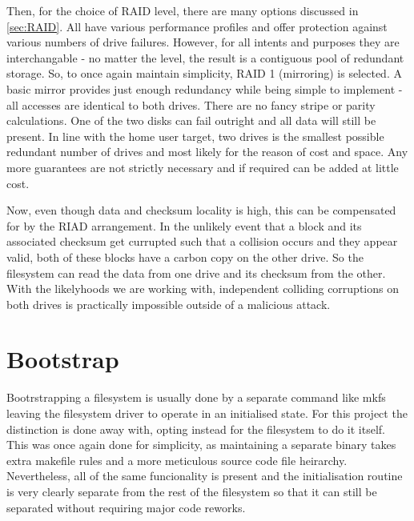         Then, for the choice of RAID level, there are many options discussed in
        \autoref{sec:RAID}. All have various performance profiles and offer
        protection against various numbers of drive failures. However, for all
        intents and purposes they are interchangable - no matter the level, the
        result is a contiguous pool of redundant storage. So, to once again
        maintain simplicity, RAID 1 (mirroring) is selected. A basic mirror
        provides just enough redundancy while being simple to implement - all
        accesses are identical to both drives. There are no fancy stripe or
        parity calculations. One of the two disks can fail outright and all
        data will still be present. In line with the home user target, two
        drives is the smallest possible redundant number of drives and most
        likely for the reason of cost and space. Any more guarantees are not
        strictly necessary and if required can be added at little cost.

        Now, even though data and checksum locality is high, this can be
        compensated for by the RIAD arrangement. In the unlikely event that a
        block and its associated checksum get currupted such that a collision
        occurs and they appear valid, both of these blocks have a carbon copy
        on the other drive. So the filesystem can read the data from one drive
        and its checksum from the other. With the likelyhoods we are working
        with, independent colliding corruptions on both drives is practically
        impossible outside of a malicious attack.

    \section{Bootstrap}

        Bootrstrapping a filesystem is usually done by a separate command like
        mkfs \cite{man_mkfs} leaving the filesystem driver to operate in an
        initialised state. For this project the distinction is done away with,
        opting instead for the filesystem to do it itself. This was once again
        done for simplicity, as maintaining a separate binary takes extra
        makefile rules and a more meticulous source code file heirarchy.
        Nevertheless, all of the same funcionality is present and the
        initialisation routine is very clearly separate from the rest of the
        filesystem so that it can still be separated without requiring major
        code reworks.

